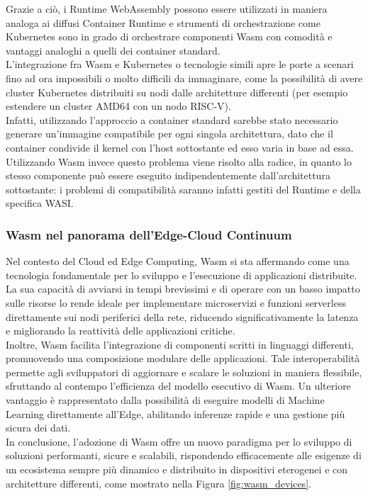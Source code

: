 Grazie a ciò, i Runtime WebAssembly possono essere utilizzati in maniera analoga ai diffusi Container Runtime e strumenti di orchestrazione come Kubernetes sono in grado di orchestrare componenti Wasm con comodità e vantaggi analoghi a quelli dei container standard\cite{10682874}.\\
L'integrazione fra Wasm e Kubernetes\cite{9978884} o tecnologie simili apre le porte a scenari fino ad ora impossibili o molto difficili da immaginare, come la possibilità di avere cluster Kubernetes distribuiti su nodi dalle architetture differenti (per esempio estendere un cluster AMD64 con un nodo RISC-V). \\
Infatti, utilizzando l'approccio a container standard sarebbe stato necessario generare un'immagine compatibile per ogni singola architettura, dato che il container condivide il kernel con l'host sottostante ed esso varia in base ad essa. Utilizzando Wasm invece questo problema viene risolto alla radice, in quanto lo stesso componente può essere eseguito indipendentemente dall'architettura sottostante: i problemi di compatibilità saranno infatti gestiti del Runtime e della specifica WASI.\\

\subsubsection{Wasm nel panorama dell'Edge-Cloud Continuum}

Nel contesto del Cloud ed Edge Computing\cite{Wallentowitz2022}, Wasm si sta affermando come una tecnologia fondamentale per lo sviluppo e l'esecuzione di applicazioni distribuite. La sua capacità di avviarsi in tempi brevissimi e di operare con un basso impatto sulle risorse lo rende ideale per implementare microservizi e funzioni serverless direttamente sui nodi periferici della rete, riducendo significativamente la latenza e migliorando la reattività delle applicazioni critiche.\\
Inoltre, Wasm facilita l'integrazione di componenti scritti in linguaggi differenti, promuovendo una composizione modulare delle applicazioni. Tale interoperabilità permette agli sviluppatori di aggiornare e scalare le soluzioni in maniera flessibile, sfruttando al contempo l'efficienza del modello esecutivo di Wasm. Un ulteriore vantaggio è rappresentato dalla possibilità di eseguire modelli di Machine Learning direttamente all'Edge, abilitando inferenze rapide e una gestione più sicura dei dati.\\
In conclusione, l'adozione di Wasm offre un nuovo paradigma per lo sviluppo di soluzioni performanti, sicure e scalabili, rispondendo efficacemente alle esigenze di un ecosistema sempre più dinamico e distribuito in dispositivi eterogenei e con architetture differenti, come mostrato nella Figura \ref{fig:wasm_devices}.

